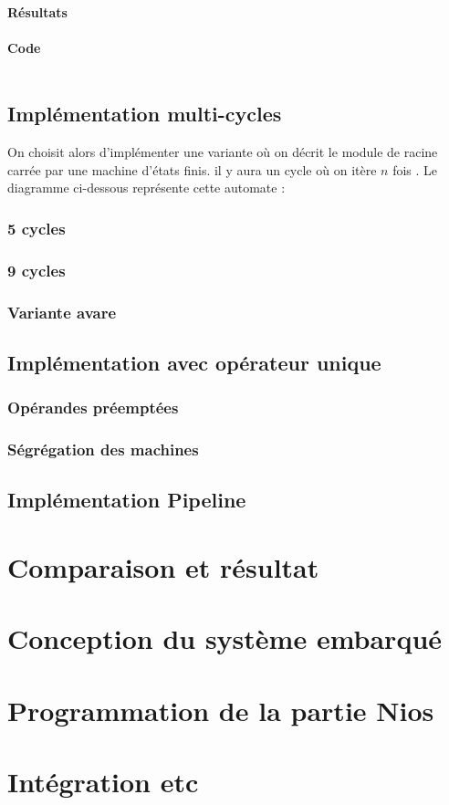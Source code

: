\documentclass[12pt,a4paper]{article}
\newcommand{\inputvhdl}[1]{\inputminted[linenos,tabsize=2]{vhdl}{./src/#1.vhd}}
\begin{document}
\paragraph{Résultats}
\paragraph{Code}
\inputvhdl{SQRT_one_process}

\subsection{Implémentation multi-cycles}
On choisit alors d'implémenter une variante où on décrit le module de racine carrée par une machine d'états finis. il y aura un cycle où on itère $n$ fois . Le diagramme ci-dessous représente cette automate :

\subsubsection{5 cycles}
\subsubsection{9 cycles}
\subsubsection{Variante avare} %

\subsection{Implémentation avec opérateur unique}
\subsubsection{Opérandes préemptées}
\subsubsection{Ségrégation des machines} %

\subsection{Implémentation Pipeline} %

\section{Comparaison et résultat}

\section{Conception du système embarqué} %
\section{Programmation de la partie Nios}
\section{Intégration etc } %
	
\end{document}
